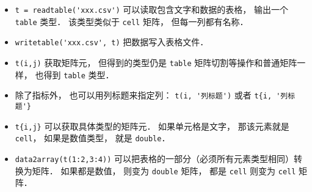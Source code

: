 
\begin{issues}
\issueDraft
\end{issues}

\begin{itemize}
\item \verb|t = readtable('xxx.csv')| 可以读取包含文字和数据的表格， 输出一个 \verb|table| 类型． 该类型类似于 \verb|cell| 矩阵， 但每一列都有名称．
\item \verb|writetable('xxx.csv', t)| 把数据写入表格文件．
\item \verb|t(i,j)| 获取矩阵元， 但得到的类型仍是 \verb|table| 矩阵切割等操作和普通矩阵一样， 也得到 \verb|table| 类型．
\item 除了指标外， 也可以用列标题来指定列： \verb|t(i, '列标题')| 或者 \verb|t{i, '列标题'}|
\item \verb|t{i,j}| 可以获取具体类型的矩阵元． 如果单元格是文字， 那该元素就是 \verb|cell|， 如果是数值类型， 就是 \verb|double|．
\item \verb|data2array(t(1:2,3:4))|  可以把表格的一部分（必须所有元素类型相同）转换为矩阵． 如果都是数值， 则变为 \verb|double| 矩阵， 都是 \verb|cell| 则变为 \verb|cell| 矩阵．
\end{itemize}
